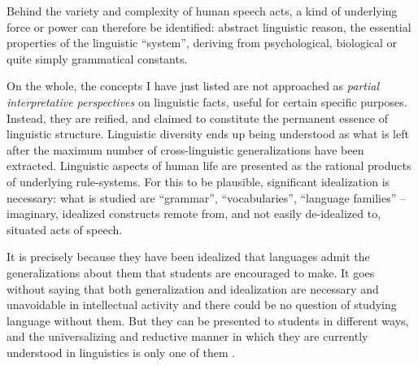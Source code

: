 \documentclass[output=paper]{langscibook}
\begin{document}
Behind the variety and complexity of human speech acts, a kind of underlying force or power can therefore be identified: abstract linguistic reason, the essential properties of the linguistic ``system'', deriving from psychological, biological or quite simply grammatical constants. 

On the whole, the concepts I have just listed are not approached as \emph{partial interpretative perspectives} on linguistic facts, useful for certain specific purposes. Instead, they are reified, and claimed to constitute the permanent essence of linguistic structure. Linguistic diversity ends up being understood as what is left after the maximum number of cross-linguistic generalizations have been extracted. Linguistic aspects of human life are presented as the rational products of underlying rule-systems. For this to be plausible, significant idealization is necessary: what is studied are ``grammar'', ``vocabularies'', ``language families'' -- imaginary, idealized constructs remote from, and not easily de-idealized to, situated acts of speech.

It is precisely because they have been idealized that languages admit the generalizations about them that students are encouraged to make. It goes without saying that both generalization and idealization are necessary and unavoidable in intellectual activity and there could be no question of studying language without them. But they can be presented to students in different ways, and the universalizing and reductive manner in which they are currently understood in linguistics is only one of them \citep[cf.][]{StokhofLambalgen2011}.
\end{document}
